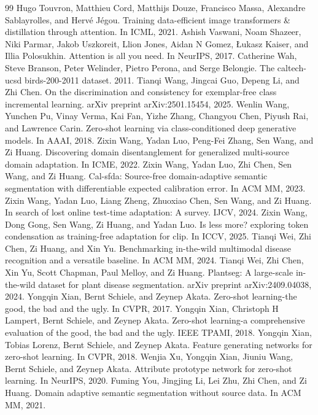 \begin{thebibliography}{99}
 Hugo Touvron, Matthieu Cord, Matthijs Douze, Francisco Massa, Alexandre Sablayrolles, and Hervé Jégou. Training data-efficient image transformers \& distillation through attention. In ICML, 2021.
 Ashish Vaswani, Noam Shazeer, Niki Parmar, Jakob Uszkoreit, Llion Jones, Aidan N Gomez, Łukasz Kaiser, and Illia Polosukhin. Attention is all you need. In NeurIPS, 2017.
 Catherine Wah, Steve Branson, Peter Welinder, Pietro Perona, and Serge Belongie. The caltech-ucsd birds-200-2011 dataset. 2011.
 Tianqi Wang, Jingcai Guo, Depeng Li, and Zhi Chen. On the discrimination and consistency for exemplar-free class incremental learning. arXiv preprint arXiv:2501.15454, 2025.
 Wenlin Wang, Yunchen Pu, Vinay Verma, Kai Fan, Yizhe Zhang, Changyou Chen, Piyush Rai, and Lawrence Carin. Zero-shot learning via class-conditioned deep generative models. In AAAI, 2018.
 Zixin Wang, Yadan Luo, Peng-Fei Zhang, Sen Wang, and Zi Huang. Discovering domain disentanglement for generalized multi-source domain adaptation. In ICME, 2022.
 Zixin Wang, Yadan Luo, Zhi Chen, Sen Wang, and Zi Huang. Cal-sfda: Source-free domain-adaptive semantic segmentation with differentiable expected calibration error. In ACM MM, 2023.
 Zixin Wang, Yadan Luo, Liang Zheng, Zhuoxiao Chen, Sen Wang, and Zi Huang. In search of lost online test-time adaptation: A survey. IJCV, 2024.
 Zixin Wang, Dong Gong, Sen Wang, Zi Huang, and Yadan Luo. Is less more? exploring token condensation as training-free adaptation for clip. In ICCV, 2025.
 Tianqi Wei, Zhi Chen, Zi Huang, and Xin Yu. Benchmarking in-the-wild multimodal disease recognition and a versatile baseline. In ACM MM, 2024.
 Tianqi Wei, Zhi Chen, Xin Yu, Scott Chapman, Paul Melloy, and Zi Huang. Plantseg: A large-scale in-the-wild dataset for plant disease segmentation. arXiv preprint arXiv:2409.04038, 2024.
 Yongqin Xian, Bernt Schiele, and Zeynep Akata. Zero-shot learning-the good, the bad and the ugly. In CVPR, 2017.
 Yongqin Xian, Christoph H Lampert, Bernt Schiele, and Zeynep Akata. Zero-shot learning-a comprehensive evaluation of the good, the bad and the ugly. IEEE TPAMI, 2018.
 Yongqin Xian, Tobias Lorenz, Bernt Schiele, and Zeynep Akata. Feature generating networks for zero-shot learning. In CVPR, 2018.
 Wenjia Xu, Yongqin Xian, Jiuniu Wang, Bernt Schiele, and Zeynep Akata. Attribute prototype network for zero-shot learning. In NeurIPS, 2020.
 Fuming You, Jingjing Li, Lei Zhu, Zhi Chen, and Zi Huang. Domain adaptive semantic segmentation without source data. In ACM MM, 2021.

\end{thebibliography}
